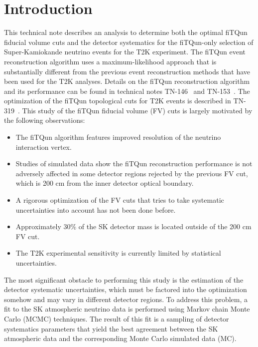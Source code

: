 
\section{Introduction}
\label{subsec:intro}

This technical note describes an analysis to determine both the optimal fiTQun
fiducial volume cuts and the detector systematics for the fiTQun-only selection
of Super-Kamiokande neutrino events for the T2K experiment.  The fiTQun event
reconstruction algorithm uses a maximum-likelihood approach that is
substantially different from the previous event reconstruction methods that
have been used for the T2K analyses.  Details on the fiTQun reconstruction
algorithm and its performance can be found in technical notes
TN-146~\cite{tn146} and TN-153~\cite{tn153}.  The optimization of the fiTQun
topological cuts for  T2K events is described in TN-319~\cite{tn319}.  This
study of the fiTQun fiducial volume (FV) cuts is largely motivated by the
following observations:

\begin{itemize}
  \item The fiTQun algorithm features improved resolution of the neutrino interaction vertex.
  \item Studies of simulated data show the fiTQun reconstruction performance is not adversely affected
    in some detector regions rejected by the previous FV cut, which is 200 cm from the inner detector
    optical boundary.
  \item A rigorous optimization of the FV cuts that tries to take systematic uncertainties into account
    has not been done before.
  \item Approximately 30\% of the SK detector mass is located outside of the 200 cm FV cut.
  \item The T2K experimental sensitivity is currently limited by statistical uncertainties.
\end{itemize}

The most significant obstacle to performing this study is the
estimation of the detector systematic uncertainties, which must be factored
into the optimization somehow and may vary in different detector regions.
To address this problem, a fit to the SK
atmospheric neutrino data is performed using Markov chain Monte Carlo (MCMC)
techniques.  The result of this fit is a sampling of detector systematics
parameters that yield the best agreement between the SK atmospheric data and
the corresponding Monte Carlo simulated data (MC).

